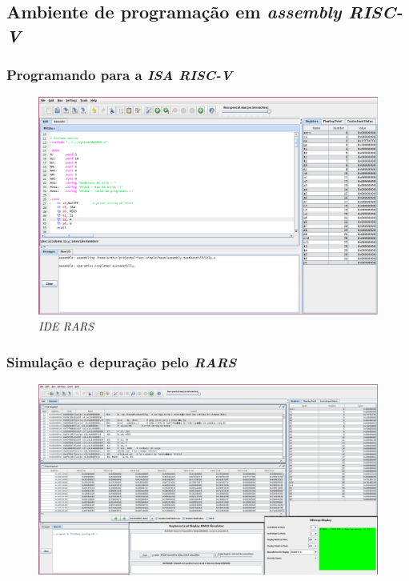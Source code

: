 \documentclass[aspectratio=169]{beamer}
\begin{document}
    \subsection{Ambiente de programação em \textit{assembly RISC-V}}
    \begin{frame}
        \frametitle{Programando para a \textit{ISA RISC-V}}
        \vfill
        \begin{figure}[H]
        \centering
            \includegraphics[width=.9\textwidth,height=.85\textheight,keepaspectratio]
            {../images/rars2.png}
            \caption{\textit{IDE RARS}}
        \end{figure}
        \vfill
    \end{frame}

    \begin{frame}
        \frametitle{Simulação e depuração pelo \textit{RARS}}
        \vfill
        \begin{figure}[H]
        \centering
            \includegraphics[width=.9\textwidth,height=.85\textheight,keepaspectratio]
            {../images/rars_debug.png}
        \end{figure}
        \vfill
    \end{frame}
\end{document}
